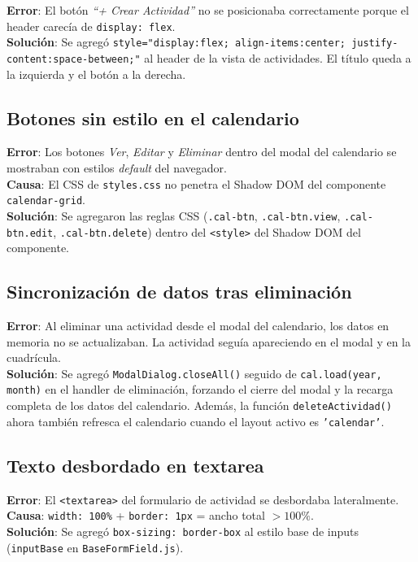 \documentclass[12pt,a4paper]{article}
\begin{document}
\textbf{Error}: El botón \textit{``+ Crear Actividad''} no se posicionaba correctamente porque el header carecía de \texttt{display: flex}.\\
\textbf{Solución}: Se agregó \texttt{style="display:flex; align-items:center; justify-content:space-between;"} al header de la vista de actividades. El título queda a la izquierda y el botón a la derecha.

\subsection{Botones sin estilo en el calendario}

\textbf{Error}: Los botones \textit{Ver}, \textit{Editar} y \textit{Eliminar} dentro del modal del calendario se mostraban con estilos \textit{default} del navegador.\\
\textbf{Causa}: El CSS de \texttt{styles.css} no penetra el Shadow DOM del componente \texttt{calendar-grid}.\\
\textbf{Solución}: Se agregaron las reglas CSS (\texttt{.cal-btn}, \texttt{.cal-btn.view}, \texttt{.cal-btn.edit}, \texttt{.cal-btn.delete}) dentro del \texttt{<style>} del Shadow DOM del componente.

\subsection{Sincronización de datos tras eliminación}

\textbf{Error}: Al eliminar una actividad desde el modal del calendario, los datos en memoria no se actualizaban. La actividad seguía apareciendo en el modal y en la cuadrícula.\\
\textbf{Solución}: Se agregó \texttt{ModalDialog.closeAll()} seguido de \texttt{cal.load(year, month)} en el handler de eliminación, forzando el cierre del modal y la recarga completa de los datos del calendario. Además, la función \texttt{deleteActividad()} ahora también refresca el calendario cuando el layout activo es \texttt{'calendar'}.

\subsection{Texto desbordado en textarea}

\textbf{Error}: El \texttt{<textarea>} del formulario de actividad se desbordaba lateralmente.\\
\textbf{Causa}: \texttt{width: 100\%} + \texttt{border: 1px} = ancho total $> 100\%$.\\
\textbf{Solución}: Se agregó \texttt{box-sizing: border-box} al estilo base de inputs (\texttt{inputBase} en \texttt{BaseFormField.js}).
\end{document}
